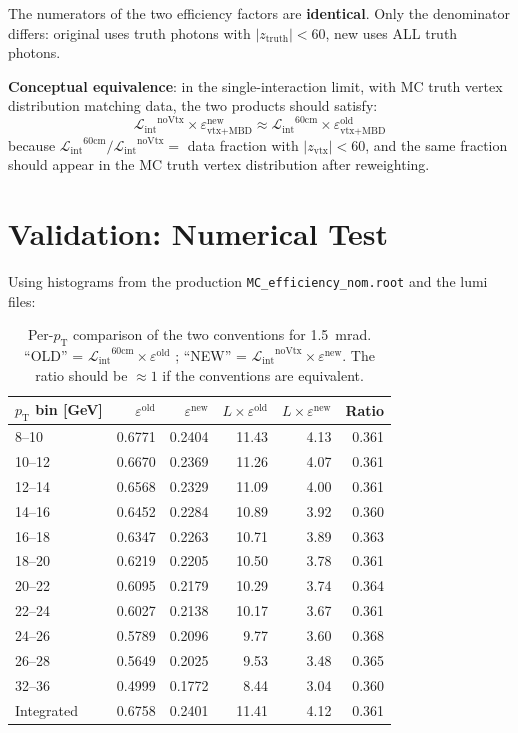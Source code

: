 \documentclass[11pt,letterpaper]{article}
\newcommand{\pT}{\ensuremath{p_{\text{T}}}}
\newcommand{\Lint}{\ensuremath{\mathcal{L}_{\text{int}}}}
\begin{document}
The numerators of the two efficiency factors are \textbf{identical}.
Only the denominator differs: original uses truth photons with
$|z_{\text{truth}}|<60$, new uses ALL truth photons.

\textbf{Conceptual equivalence}: in the single-interaction limit, with
MC truth vertex distribution matching data, the two products should
satisfy:
\begin{equation}
  \Lint^{\text{noVtx}} \times \varepsilon_{\text{vtx+MBD}}^{\text{new}}
  \approx
  \Lint^{60\text{cm}} \times \varepsilon_{\text{vtx+MBD}}^{\text{old}}
  \label{eq:equiv}
\end{equation}
because $\Lint^{60\text{cm}} / \Lint^{\text{noVtx}} = $ data fraction with
$|z_{\text{vtx}}|<60$, and the same fraction should appear in the MC truth
vertex distribution after reweighting.

\section{Validation: Numerical Test}
\label{sec:validation}

Using histograms from the production
\texttt{MC\_efficiency\_nom.root} and the lumi files:

\begin{table}[htbp]
\centering
\caption{Per-$\pT$ comparison of the two conventions for 1.5~mrad.
  ``OLD'' = $\Lint^{60\text{cm}} \times \varepsilon^{\text{old}}$ ;
  ``NEW'' = $\Lint^{\text{noVtx}} \times \varepsilon^{\text{new}}$.
  The ratio should be $\approx 1$ if the conventions are equivalent.}
\label{tab:validation}
\small
\begin{tabular}{lrrrrr}
\toprule
\textbf{$\pT$ bin [GeV]} & \textbf{$\varepsilon^{\text{old}}$} &
  \textbf{$\varepsilon^{\text{new}}$} & \textbf{$L\!\times\!\varepsilon^{\text{old}}$} &
  \textbf{$L\!\times\!\varepsilon^{\text{new}}$} & \textbf{Ratio} \\
\midrule
8--10    & 0.6771 & 0.2404 & 11.43 & 4.13 & 0.361 \\
10--12   & 0.6670 & 0.2369 & 11.26 & 4.07 & 0.361 \\
12--14   & 0.6568 & 0.2329 & 11.09 & 4.00 & 0.361 \\
14--16   & 0.6452 & 0.2284 & 10.89 & 3.92 & 0.360 \\
16--18   & 0.6347 & 0.2263 & 10.71 & 3.89 & 0.363 \\
18--20   & 0.6219 & 0.2205 & 10.50 & 3.78 & 0.361 \\
20--22   & 0.6095 & 0.2179 & 10.29 & 3.74 & 0.364 \\
22--24   & 0.6027 & 0.2138 & 10.17 & 3.67 & 0.361 \\
24--26   & 0.5789 & 0.2096 & 9.77  & 3.60 & 0.368 \\
26--28   & 0.5649 & 0.2025 & 9.53  & 3.48 & 0.365 \\
32--36   & 0.4999 & 0.1772 & 8.44  & 3.04 & 0.360 \\
\midrule
Integrated & 0.6758 & 0.2401 & 11.41 & 4.12 & 0.361 \\
\bottomrule
\end{tabular}
\end{table}
\end{document}

